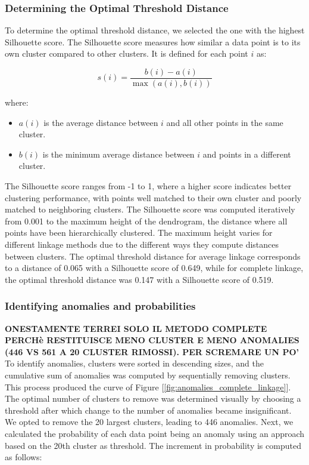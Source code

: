 \documentclass[a4paper]{article}
\begin{document}
\subsubsection{Determining the Optimal Threshold Distance}
To determine the optimal threshold distance, we selected the one with the highest Silhouette score. The Silhouette score measures how similar a data point is to its own cluster compared to other clusters. It is defined for each point \(i\) as:

\begin{equation}
    s(i) = \frac{b(i) - a(i)}{\max(a(i), b(i))}
\end{equation}

where:
\begin{itemize}
    \item \(a(i)\) is the average distance between \(i\) and all other points in the same cluster.
    \item \(b(i)\) is the minimum average distance between \(i\) and points in a different cluster.
\end{itemize}

The Silhouette score ranges from -1 to 1, where a higher score indicates better clustering performance, with points well matched to their own cluster and poorly matched to neighboring clusters. \newline
The Silhouette score was computed iteratively from 0.001 to the maximum height of the dendrogram, the distance where all points have been hierarchically clustered. The maximum height varies for different linkage methods due to the different ways they compute distances between clusters. \newline
The optimal threshold distance for average linkage corresponds to a distance of 0.065 with a Silhouette score of 0.649, while for complete linkage, the optimal threshold distance was 0.147 with a Silhouette score of 0.519.

\subsubsection{Identifying anomalies and probabilities}
\textbf{ONESTAMENTE TERREI SOLO IL METODO COMPLETE PERCHè RESTITUISCE MENO CLUSTER E MENO ANOMALIES (446 VS 561 A 20 CLUSTER RIMOSSI). PER SCREMARE UN PO'} \newline
To identify anomalies, clusters were sorted in descending sizes, and the cumulative sum of anomalies was computed by sequentially removing clusters. This process produced the curve of Figure [\ref{fig:anomalies_complete_linkage}].
The optimal number of clusters to remove was determined visually by choosing a threshold after which change to the number of anomalies became insignificant. We opted to remove the 20 largest clusters, leading to 446 anomalies. \newline
Next, we calculated the probability of each data point being an anomaly using an approach based on the 20th cluster as threshold. The increment in probability is computed as follows:
\end{document}
